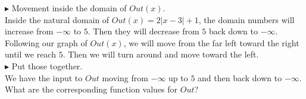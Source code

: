 \documentclass{ximera}
\begin{document}
\textbf{\textcolor{blue!75!black}{$\blacktriangleright$}}  Movement inside the domain of $Out(x)$.\\



Inside the natural domain of $Out(x) =2|x-3|+1$, the domain numbers will increase from $-\infty$ to $5$.  Then they will decrease from $5$ back down to $-\infty$. \\

Following our graph of $Out(x)$, we will move from the far left toward the right until we reach $5$.  Then we will turn around and move toward the left.\\



\textbf{\textcolor{blue!75!black}{$\blacktriangleright$}}  Put those together. \\



We have the input to $Out$ moving from $-\infty$ up to $5$ and then back down to $-\infty$.  What are the corresponding function values for $Out$?
\end{document}
